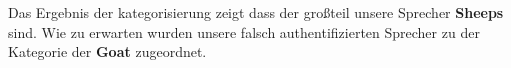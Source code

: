 \begin{table}[h]
\label{table:resultsZoo}
\end{table}


Das Ergebnis der kategorisierung zeigt dass der großteil unsere Sprecher \textbf{Sheeps} sind.
Wie zu erwarten wurden unsere falsch authentifizierten Sprecher zu der Kategorie der \textbf{Goat} zugeordnet.




